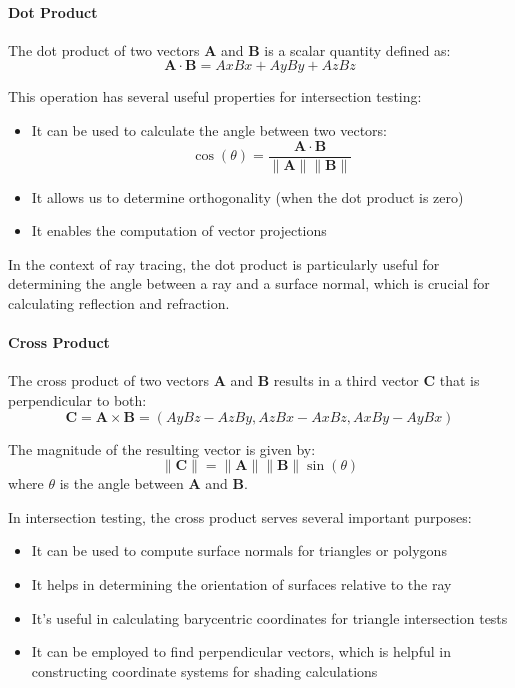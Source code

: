 \documentclass[12pt]{article}
\begin{document}
\paragraph{Dot Product}
The dot product of two vectors \(\mathbf{A}\) and \(\mathbf{B}\) is a scalar quantity defined as:
\[
    \mathbf{A} \cdot \mathbf{B} = Ax Bx + Ay By + Az Bz
\]

This operation has several useful properties for intersection testing:

\begin{itemize}
    \item It can be used to calculate the angle between two vectors:
          \[
              \cos(\theta) = \frac{\mathbf{A} \cdot \mathbf{B}}{\|\mathbf{A}\| \|\mathbf{B}\|}
          \]
    \item It allows us to determine orthogonality (when the dot product is zero)
    \item It enables the computation of vector projections
\end{itemize}

In the context of ray tracing, the dot product is particularly useful for determining the angle between a ray and a surface normal, which is crucial for calculating reflection and refraction.

\paragraph{Cross Product}
The cross product of two vectors \(\mathbf{A}\) and \(\mathbf{B}\) results in a third vector \(\mathbf{C}\) that is perpendicular to both:
\[
    \mathbf{C} = \mathbf{A} \times \mathbf{B} = \left( Ay Bz - Az By, Az Bx - Ax Bz, Ax By - Ay Bx \right)
\]

The magnitude of the resulting vector is given by:
\[
    \|\mathbf{C}\| = \|\mathbf{A}\| \|\mathbf{B}\| \sin(\theta)
\]
where \(\theta\) is the angle between \(\mathbf{A}\) and \(\mathbf{B}\).

In intersection testing, the cross product serves several important purposes:

\begin{itemize}
    \item It can be used to compute surface normals for triangles or polygons
    \item It helps in determining the orientation of surfaces relative to the ray
    \item It's useful in calculating barycentric coordinates for triangle intersection tests
    \item It can be employed to find perpendicular vectors, which is helpful in constructing coordinate systems for shading calculations
\end{itemize}
\end{document}
